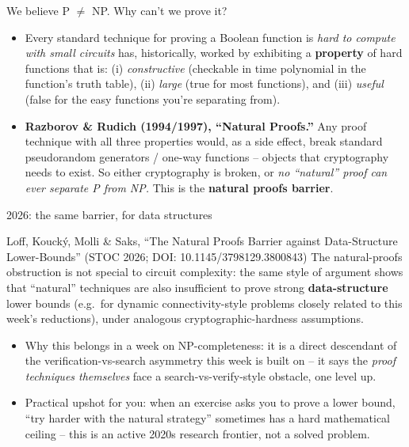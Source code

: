 \documentclass[11pt,aspectratio=169]{beamer}
\begin{document}
\begin{frame}{We believe P $\neq$ NP. Why can't we prove it?}
  \begin{itemize}
    \item Every standard technique for proving a Boolean function is \emph{hard to
    compute with small circuits} has, historically, worked by exhibiting a
    \textbf{property} of hard functions that is: (i) \emph{constructive} (checkable in
    time polynomial in the function's truth table), (ii) \emph{large} (true for most
    functions), and (iii) \emph{useful} (false for the easy functions you're separating
    from).
    \item \textbf{Razborov \& Rudich (1994/1997), ``Natural Proofs.''} Any proof
    technique with all three properties would, as a side effect, break standard
    pseudorandom generators / one-way functions -- objects that cryptography needs to
    exist. So either cryptography is broken, or \emph{no ``natural'' proof can ever
    separate P from NP.} This is the \textbf{natural proofs barrier}.
  \end{itemize}
\end{frame}

\begin{frame}{2026: the same barrier, for data structures}
  \begin{block}{Loff, Kouck\'{y}, Molli \& Saks, ``The Natural Proofs Barrier against
  Data-Structure Lower-Bounds'' (STOC 2026; DOI: 10.1145/3798129.3800843)}
    The natural-proofs obstruction is not special to circuit complexity: the same
    style of argument shows that ``natural'' techniques are also insufficient to prove
    strong \textbf{data-structure} lower bounds (e.g.\ for dynamic connectivity-style
    problems closely related to this week's reductions), under analogous
    cryptographic-hardness assumptions.
  \end{block}
  \begin{itemize}
    \item Why this belongs in a week on NP-completeness: it is a direct descendant of
    the verification-vs-search asymmetry this week is built on -- it says the
    \emph{proof techniques themselves} face a search-vs-verify-style obstacle,
    one level up.
    \item Practical upshot for you: when an exercise asks you to prove a lower bound,
    ``try harder with the natural strategy'' sometimes has a hard mathematical ceiling
    -- this is an active 2020s research frontier, not a solved problem.
  \end{itemize}
\end{frame}
\end{document}
